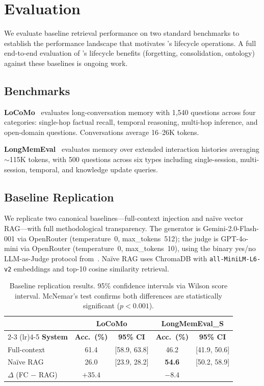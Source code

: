 \section{Evaluation}
\label{sec:evaluation}

We evaluate baseline retrieval performance on two standard benchmarks to
establish the performance landscape that motivates \alaya{}'s lifecycle
operations. A full end-to-end evaluation of \alaya{}'s lifecycle benefits
(forgetting, consolidation, ontology) against these baselines is ongoing
work.

\subsection{Benchmarks}

\textbf{LoCoMo}~\cite{maharana2024locomo} evaluates long-conversation
memory with 1,540 questions across four categories: single-hop factual
recall, temporal reasoning, multi-hop inference, and open-domain questions.
Conversations average 16--26K tokens.

\textbf{LongMemEval}~\cite{wu2025longmemeval} evaluates memory over
extended interaction histories averaging ${\sim}$115K tokens, with 500
questions across six types including single-session, multi-session, temporal,
and knowledge update queries.

\subsection{Baseline Replication}

We replicate two canonical baselines---full-context injection and na\"ive
vector RAG---with full methodological transparency. The generator is
Gemini-2.0-Flash-001 via OpenRouter (temperature~0, max\_tokens~512); the
judge is GPT-4o-mini via OpenRouter (temperature~0, max\_tokens~10), using
the binary yes/no LLM-as-Judge protocol from~\cite{maharana2024locomo}.
Na\"ive RAG uses ChromaDB with \texttt{all-MiniLM-L6-v2} embeddings and
top-10 cosine similarity retrieval.

\begin{table}[!t]
\centering
\caption{Baseline replication results. 95\% confidence intervals via Wilson
score interval. McNemar's test confirms both differences are statistically
significant ($p < 0.001$).}
\label{tab:baselines}
\small
\begin{tabular}{@{}lcccc@{}}
\toprule
& \multicolumn{2}{c}{\textbf{LoCoMo}} & \multicolumn{2}{c}{\textbf{LongMemEval\_S}} \\
\cmidrule(lr){2-3} \cmidrule(lr){4-5}
\textbf{System} & \textbf{Acc.\ (\%)} & \textbf{95\% CI} & \textbf{Acc.\ (\%)} & \textbf{95\% CI} \\
\midrule
Full-context & 61.4 & [58.9, 63.8] & 46.2 & [41.9, 50.6] \\
Na\"ive RAG  & 26.0 & [23.9, 28.2] & \textbf{54.6} & [50.2, 58.9] \\
\midrule
$\Delta$ (FC $-$ RAG) & $+35.4$ & & $-8.4$ & \\
\bottomrule
\end{tabular}
\end{table}

